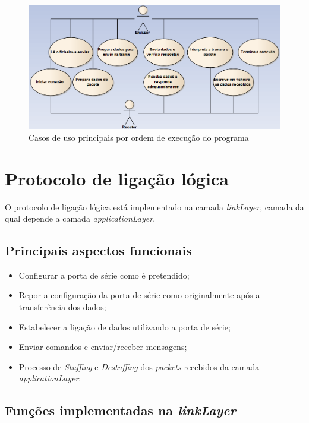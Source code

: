 \documentclass[11pt]{article}
\begin{document}
\begin{figure}[h!]
\begin{center}
\includegraphics[scale=0.46]{useCases.png}
\caption{Casos de uso principais por ordem de execução do programa}
\label{fig:codigoFigura}
\end{center}
\end{figure}


\newpage
\section{Protocolo de ligação lógica}

O protocolo de ligação lógica está implementado na camada \textit{linkLayer}, camada da qual depende a camada \textit{applicationLayer}.

\subsection{Principais aspectos funcionais}
\small
\begin{itemize}
\setlength\itemsep{0em}
  \item Configurar a porta de série como é pretendido;
  \item Repor a configuração da porta de série como originalmente após a transferência dos dados;
  \item  Estabelecer a ligação de dados utilizando a porta de série;
  \item  Enviar comandos e  enviar/receber mensagens;
  \item Processo de \textit{Stuffing} e \textit{Destuffing} dos \textit{packets} recebidos da camada \textit{applicationLayer}.
\end{itemize}
\normalsize


\subsection{Funções implementadas na \textit{linkLayer}}
\end{document}

